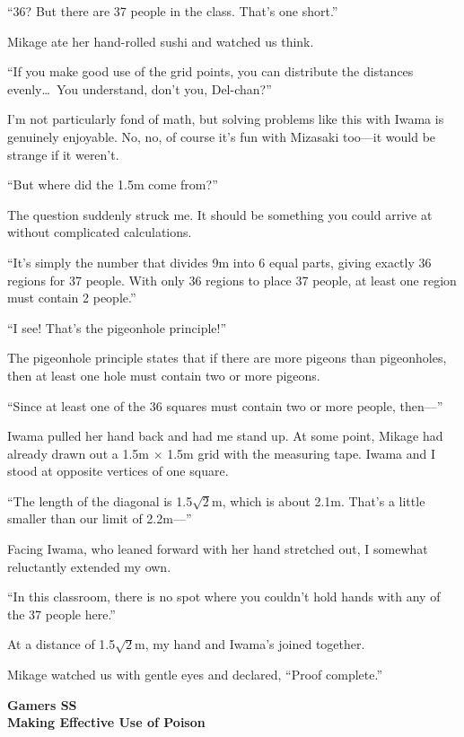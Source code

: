\documentclass[
    a4paper,
    12pt,
    twoside,
    openany,
    UTF8,
    fontset=windows
]{ctexbook}
\begin{document}
``36? But there are 37 people in the class. That's one short.''

Mikage ate her hand-rolled sushi and watched us think.

``If you make good use of the grid points, you can distribute the distances evenly\dots\ You understand, don't you, Del-chan?''

I'm not particularly fond of math, but solving problems like this with Iwama is genuinely enjoyable. No, no, of course it's fun with Mizasaki too---it would be strange if it weren't.

``But where did the 1.5m come from?''

The question suddenly struck me. It should be something you could arrive at without complicated calculations.

``It's simply the number that divides 9m into 6 equal parts, giving exactly 36 regions for 37 people. With only 36 regions to place 37 people, at least one region must contain 2 people.''

``I see! That's the pigeonhole principle!''

The pigeonhole principle states that if there are more pigeons than pigeonholes, then at least one hole must contain two or more pigeons.

``Since at least one of the 36 squares must contain two or more people, then---''

Iwama pulled her hand back and had me stand up. At some point, Mikage had already drawn out a 1.5m $\times$ 1.5m grid with the measuring tape. Iwama and I stood at opposite vertices of one square.

``The length of the diagonal is 1.5$\sqrt{2}$m, which is about 2.1m. That's a little smaller than our limit of 2.2m---''

Facing Iwama, who leaned forward with her hand stretched out, I somewhat reluctantly extended my own.

``In this classroom, there is no spot where you couldn't hold hands with any of the 37 people here.''

At a distance of 1.5$\sqrt{2}$m, my hand and Iwama's joined together.

Mikage watched us with gentle eyes and declared, ``Proof complete.''

\clearpage
\thispagestyle{plain}
\begin{center}
    \large\bfseries
    Gamers SS\\
    Making Effective Use of Poison
\end{center}
\label{sec:g}
\vspace{1cm}
\end{document}
